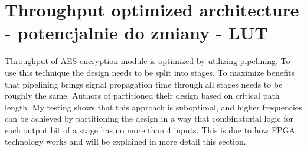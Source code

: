 \section{Throughput optimized architecture - potencjalnie do zmiany - LUT}
\label{sec:components-performance-tests}

Throughput of AES encryption module is optimized by utilizing pipelining. To use this technique the design needs to be split into stages. To maximize benefits that pipelining brings signal propagation time through all stages needs to be roughly the same. Authors of \cite{dupa} partitioned their design based on critical path length. My testing shows that this approach is suboptimal, and higher frequencies can be achieved by partitioning the design in a way that combinatorial logic for each output bit of a stage has no more than 4 inputs. This is due to how FPGA technology works and will be explained in more detail this section.

% 
% 
% 
% 
% 
% 
% 
% 
% 
% 
% 

